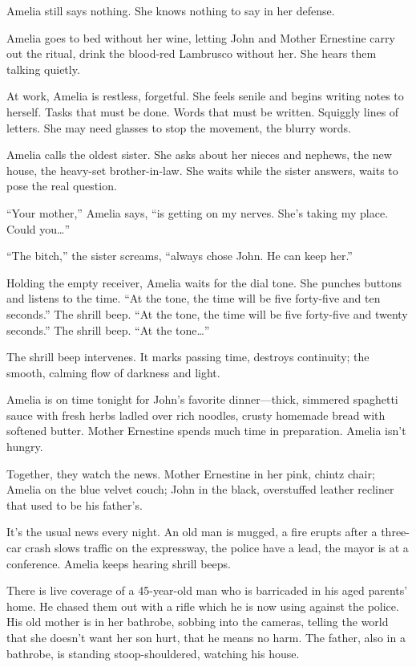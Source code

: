 \documentclass[
]{article}
\begin{document}
Amelia still says nothing. She knows nothing to say in her defense.

Amelia goes to bed without her wine, letting John and Mother Ernestine
carry out the ritual, drink the blood-red Lambrusco without her. She
hears them talking quietly.

At work, Amelia is restless, forgetful. She feels senile and begins
writing notes to herself. Tasks that must be done. Words that must be
written. Squiggly lines of letters. She may need glasses to stop the
movement, the blurry words.

Amelia calls the oldest sister. She asks about her nieces and nephews,
the new house, the heavy-set brother-in-law. She waits while the sister
answers, waits to pose the real question.

``Your mother,'' Amelia says, ``is getting on my nerves. She's taking my
place. Could you\ldots''

``The bitch,'' the sister screams, ``always chose John. He can keep
her.''

Holding the empty receiver, Amelia waits for the dial tone. She punches
buttons and listens to the time. ``At the tone, the time will be five
forty-five and ten seconds.'' The shrill beep. ``At the tone, the time
will be five forty-five and twenty seconds.'' The shrill beep. ``At the
tone\ldots''

The shrill beep intervenes. It marks passing time, destroys continuity;
the smooth, calming flow of darkness and light.

Amelia is on time tonight for John's favorite dinner---thick, simmered
spaghetti sauce with fresh herbs ladled over rich noodles, crusty
homemade bread with softened butter. Mother Ernestine spends much time
in preparation. Amelia isn't hungry.

Together, they watch the news. Mother Ernestine in her pink, chintz
chair; Amelia on the blue velvet couch; John in the black, overstuffed
leather recliner that used to be his father's.

It's the usual news every night. An old man is mugged, a fire erupts
after a three-car crash slows traffic on the expressway, the police have
a lead, the mayor is at a conference. Amelia keeps hearing shrill beeps.

There is live coverage of a 45-year-old man who is barricaded in his
aged parents' home. He chased them out with a rifle which he is now
using against the police. His old mother is in her bath­robe, sobbing
into the cameras, telling the world that she doesn't want her son hurt,
that he means no harm. The father, also in a bathrobe, is standing
stoop-shouldered, watching his house.
\end{document}
